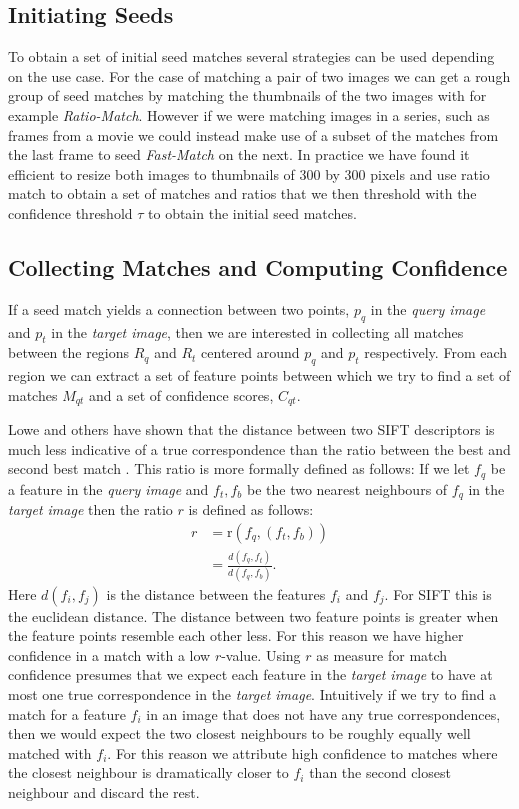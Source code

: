 \documentclass[runningheads]{llncs}
\begin{document}
\subsection{Initiating Seeds}
\label{seeds}
To obtain a set of initial seed matches several strategies can be used depending on the use case. For the case of matching a pair of two images we can get a rough group of seed matches by matching the thumbnails of the two images with for example \emph{Ratio-Match}. However if we were matching images in a series, such as frames from a movie we could instead make use of a subset of the matches from the last frame to seed \emph{Fast-Match} on the next. In practice we have found it efficient to resize both images to thumbnails of 300 by 300 pixels and use ratio match to obtain a set of matches and ratios that we then threshold with the confidence threshold $\tau$ to obtain the initial seed matches.

\subsection{Collecting Matches and Computing Confidence}
\label{collection}
If a seed match yields a connection between two points, $p_q$ in the \emph{query image} and $p_t$ in the \emph{target image}, then we are interested in collecting all matches between the regions $R_q$ and $R_t$ centered around $p_q$ and $p_t$ respectively. From each region we can extract a set of feature points between which we try to find a set of matches $M_{qt} $ and a set of confidence scores, $C_{qt}$.

Lowe and others have shown that the distance between two SIFT descriptors is much less indicative of a true correspondence than the ratio between the best and second best match \cite{lowe2004sift,mikolajczyk2005performance,moreels2007evaluation,rabin2009statistical}. This ratio is more formally defined as follows: If we let $f_q$ be a feature in the \emph{query image} and $f_t, f_b$ be the two nearest neighbours of $f_q$ in the \emph{target image} then the ratio $r$ is defined as follows:
\begin{align*}
    r &= \text{r}(f_{q}, (f_t, f_b)) \\
        &= \frac{d(f_{q}, f_{t})}{d(f_{q}, f_{b})}.
\end{align*}
Here $d(f_i,f_j)$ is the distance between the features $f_i$ and $f_j$. For SIFT this is the euclidean distance. The distance between two feature points is greater when the feature points resemble each other less. For this reason we have higher confidence in a match with a low $r$-value. Using $r$ as measure for match confidence presumes that we expect each feature in the \emph{target image} to have at most one true correspondence in the \emph{target image}. Intuitively if we try to find a match for a feature $f_i$ in an image that does not have any true correspondences, then we would expect the two closest neighbours to be roughly equally well matched with $f_i$. For this reason we attribute high confidence to matches where the closest neighbour is dramatically closer to $f_i$ than the second closest neighbour and discard the rest.
\end{document}

